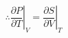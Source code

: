 \documentclass[12pt]{exam}
\begin{document}
\begin{questions}
\begin{solution}
	\begin{equation*}
	\therefore \left.\frac{\partial P}{\partial T}\right|_{V}=\left.\frac{\partial S}{\partial V}\right|_{T}
	\end{equation*}
	
	\end{solution}




\end{questions}
\end{document}
